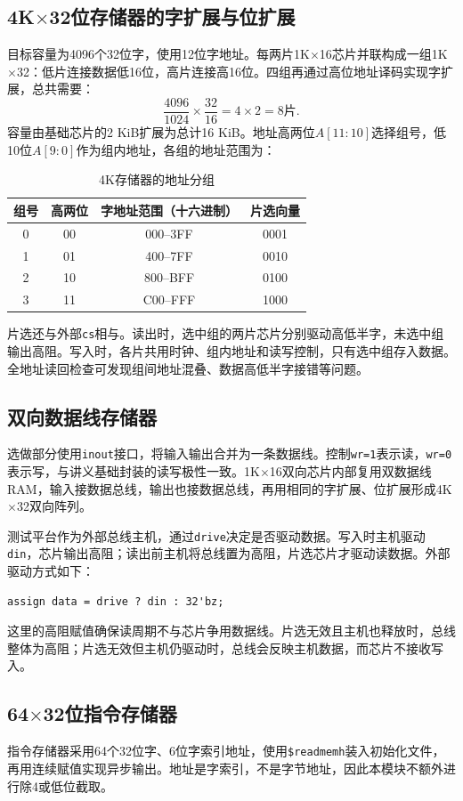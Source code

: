 \documentclass[12pt,a4paper]{ctexart}
\begin{document}
\subsection{4K$\times$32位存储器的字扩展与位扩展}
目标容量为4096个32位字，使用12位字地址。每两片1K$\times$16芯片并联构成一组1K$\times$32：低片连接数据低16位，高片连接高16位。四组再通过高位地址译码实现字扩展，总共需要：
\begin{equation}
\frac{4096}{1024}\times\frac{32}{16}=4\times2=8\text{片}.
\end{equation}
容量由基础芯片的2 KiB扩展为总计16 KiB。地址高两位$A[11:10]$选择组号，低10位$A[9:0]$作为组内地址，各组的地址范围为：
\begin{table}[H]
\centering
\caption{4K存储器的地址分组}
\begin{tabular}{cccc}
\toprule
组号 & 高两位 & 字地址范围（十六进制） & 片选向量\\
\midrule
0 & 00 & 000--3FF & 0001\\
1 & 01 & 400--7FF & 0010\\
2 & 10 & 800--BFF & 0100\\
3 & 11 & C00--FFF & 1000\\
\bottomrule
\end{tabular}
\end{table}
片选还与外部\texttt{cs}相与。读出时，选中组的两片芯片分别驱动高低半字，未选中组输出高阻。写入时，各片共用时钟、组内地址和读写控制，只有选中组存入数据。全地址读回检查可发现组间地址混叠、数据高低半字接错等问题。

\subsection{双向数据线存储器}
选做部分使用\texttt{inout}接口，将输入输出合并为一条数据线。控制\texttt{wr=1}表示读，\texttt{wr=0}表示写，与讲义基础封装的读写极性一致。1K$\times$16双向芯片内部复用双数据线RAM，输入接数据总线，输出也接数据总线，再用相同的字扩展、位扩展形成4K$\times$32双向阵列。

测试平台作为外部总线主机，通过\texttt{drive}决定是否驱动数据。写入时主机驱动\texttt{din}，芯片输出高阻；读出前主机将总线置为高阻，片选芯片才驱动读数据。外部驱动方式如下：
\begin{lstlisting}
assign data = drive ? din : 32'bz;
\end{lstlisting}
这里的高阻赋值确保读周期不与芯片争用数据线。片选无效且主机也释放时，总线整体为高阻；片选无效但主机仍驱动时，总线会反映主机数据，而芯片不接收写入。

\subsection{64$\times$32位指令存储器}
指令存储器采用64个32位字、6位字索引地址，使用\texttt{\$readmemh}装入初始化文件，再用连续赋值实现异步输出。地址是字索引，不是字节地址，因此本模块不额外进行除4或低位截取。
\end{document}
